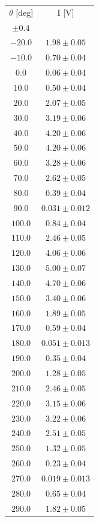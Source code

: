 \documentclass[10pt,oneside,a4paper]{article}
\begin{document}
\begin{table}[H]
\centering
{}
\label{tab:malus2}
\begin{tabular}{cc}
\hline
 $\theta$ [deg]& I [V]\\
 $\pm 0.4$ & \\
\hline
  $-20.0 $&$ 1.98 \pm 0.05$ \\
  $-10.0 $&$ 0.70 \pm 0.04$ \\
  $  0.0 $& $0.06  \pm0.04 $\\
  $ 10.0 $&$ 0.50 \pm 0.04$ \\
  $  20.0$ &$ 2.07 \pm 0.05$ \\
  $ 30.0 $&$ 3.19 \pm 0.06$ \\
  $ 40.0 $&$ 4.20 \pm 0.06$ \\
  $ 50.0 $&$ 4.20 \pm 0.06$ \\
  $ 60.0 $&$ 3.28 \pm 0.06$ \\
  $ 70.0 $&$ 2.62 \pm 0.05$ \\
  $ 80.0 $&$ 0.39 \pm 0.04$ \\
  $ 90.0 $&$ 0.031 \pm 0.012$ \\
  $100.0$ &$ 0.84 \pm 0.04$ \\
  $110.0$ &$ 2.46 \pm 0.05$ \\
  $120.0$ &$ 4.06 \pm 0.06$ \\
  $130.0$ &$ 5.00 \pm 0.07$ \\
  $140.0$ &$ 4.70 \pm 0.06$ \\
  $150.0$ &$ 3.40 \pm0.06$ \\
  $160.0$ &$ 1.89 \pm0.05$ \\
  $170.0$ &$ 0.59 \pm 0.04$ \\
  $180.0$ &$ 0.051 \pm 0.013$ \\
  $190.0$ &$ 0.35 \pm 0.04$ \\
  $200.0$ &$ 1.28 \pm 0.05$ \\
  $210.0$ &$ 2.46 \pm 0.05$ \\
  $220.0$ &$ 3.15 \pm 0.06$ \\
  $230.0$ &$ 3.22 \pm 0.06$ \\
  $240.0$ &$ 2.51 \pm 0.05$ \\
  $250.0$ &$ 1.32 \pm 0.05$ \\
  $260.0$ &$ 0.23 \pm 0.04$ \\
  $270.0$ &$ 0.019 \pm 0.013$ \\
  $280.0$ &$ 0.65 \pm 0.04$ \\
  $290.0$ &$ 1.82 \pm 0.05$ \\

\end{tabular}
\end{table}
\end{document}
